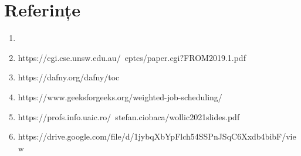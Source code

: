\chapter*{Referințe} 

\begin{enumerate}
    \item 
    \item https://cgi.cse.unsw.edu.au/~eptcs/paper.cgi?FROM2019.1.pdf
    \item https://dafny.org/dafny/toc
    \item https://www.geeksforgeeks.org/weighted-job-scheduling/
    \item https://profs.info.uaic.ro/~stefan.ciobaca/wollic2021slides.pdf
    \item https://drive.google.com/file/d/1jybqXbYpFlch54SSPnJSqC6Xxdb4bibF/view
\end{enumerate}
